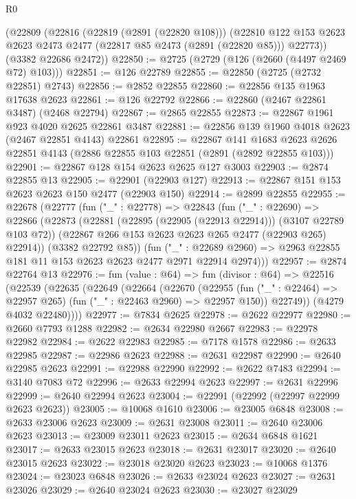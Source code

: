 \begin{lexlean}{R0}
\begin{coremodule}
    (@22809
      (@22816
        (@22819 (@2891 (@22820 @108)))
        (@22810 @122 @153 @2623 @2623 @2473 @2477 (@22817 @85 @2473 (@2891 (@22820 @85))) @22773))
      (@3382 @22686 @2472))
@22850 := @2725 (@2729 (@126 (@2660 (@4497 @2469 @72) @103)))
@22851 := @126 @22789
@22855 := @22850 (@2725 (@2732 @22851) @2743)
@22856 := @2852 @22855
@22860 := @22856 @135 @1963 @17638 @2623
@22861 := @126 @22792
@22866 := @22860 (@2467 @22861 @3487) (@2468 @22794)
@22867 := @2865 @22855
@22873 := @22867 @1961 @923 @4020 @2625 @22861 @3487
@22881 := @22856 @139 @1960 @4018 @2623 (@2467 @22851 @4143) @22861
@22895 := @22867
    @141
    @1683
    @2623
    @2626
    @22851
    @4143
    (@2886 @22855 @103 @22851 (@2891 (@2892 @22855 @103)))
@22901 := @22867 @128 @154 @2623 @2625 @127 @3003
@22903 := @2874 @22855 @13
@22905 := @22901 (@22903 @127)
@22913 := @22867 @151 @153 @2623 @2623 @150 @2477 (@22903 @150)
@22914 := @2899 @22855
@22955 := @22678
    (@22777
      (fun ("_" : @22778) =>
      @22843
        (fun ("_" : @22690) =>
        @22866
          (@22873
            (@22881 (@22895 (@22905 (@22913 @22914))) (@3107 @22789 @103 @72))
            (@22867 @266 @153 @2623 @2623 @265 @2477 (@22903 @265) @22914))
          (@3382 @22792 @85))
        (fun ("_" : @22689 @2960) =>
        @2963 @22855 @181 @11 @153 @2623 @2623 @2477 @2971 @22914 @2974)))
@22957 := @2874 @22764 @13
@22976 := fun (value : @64) =>
  fun (divisor : @64) =>
  @22516
    (@22539
      (@22635
        (@22649
          (@22664
            (@22670
              (@22955 (fun ("_" : @22464) => @22957 @265) (fun ("_" : @22463 @2960) => @22957 @150))
              @22749))
          (@4279 @4032 @22480))))
@22977 := @7834 @2625
@22978 := @2622 @22977
@22980 := @2660 @7793 @1288
@22982 := @2634 @22980 @2667
@22983 := @22978 @22982
@22984 := @2622 @22983
@22985 := @7178 @1578
@22986 := @2633 @22985
@22987 := @22986 @2623
@22988 := @2631 @22987
@22990 := @2640 @22985 @2623
@22991 := @22988 @22990
@22992 := @2622 @7483
@22994 := @3140 @7083 @72
@22996 := @2633 @22994 @2623
@22997 := @2631 @22996
@22999 := @2640 @22994 @2623
@23004 := @22991 (@22992 (@22997 @22999 @2623 @2623))
@23005 := @10068 @1610
@23006 := @23005 @6848
@23008 := @2633 @23006 @2623
@23009 := @2631 @23008
@23011 := @2640 @23006 @2623
@23013 := @23009 @23011 @2623
@23015 := @2634 @6848 @1621
@23017 := @2633 @23015 @2623
@23018 := @2631 @23017
@23020 := @2640 @23015 @2623
@23022 := @23018 @23020 @2623
@23023 := @10068 @1376
@23024 := @23023 @6848
@23026 := @2633 @23024 @2623
@23027 := @2631 @23026
@23029 := @2640 @23024 @2623
@23030 := @23027 @23029

\end{coremodule}
\end{lexlean}
